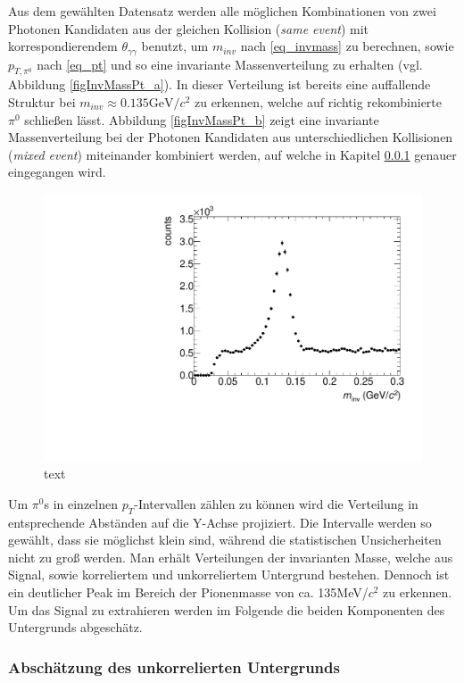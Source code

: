 \documentclass[]{article}
\begin{document}
	Aus dem gew{\"a}hlten Datensatz werden alle m{\"o}glichen Kombinationen von zwei Photonen Kandidaten aus der gleichen Kollision ({\it same event}) mit korrespondierendem $\theta_{\gamma\gamma}$ benutzt, um $m_{inv}$ nach \ref{eq_invmass} zu berechnen, sowie $p_{T,\pi^{0}}$ nach \ref{eq_pt} und so eine invariante Massenverteilung zu erhalten (vgl. Abbildung \ref{figInvMassPt_a}). In dieser Verteilung ist bereits eine auffallende Struktur bei $m_{inv}\approx 0.135\text{GeV/}c^{2}$ zu erkennen, welche auf richtig rekombinierte $\pi^{0}$ schlie{\ss}en l{\"a}sst. Abbildung \ref{figInvMassPt_b} zeigt eine invariante Massenverteilung bei der Photonen Kandidaten aus unterschiedlichen Kollisionen ({\it mixed event}) miteinander kombiniert werden, auf welche in Kapitel \ref{sssec:num3} genauer eingegangen wird.\newline
	
	\begin{figure}[tbp]
		\centering
		\includegraphics[width=.8\linewidth]{hSignalPlusBkg.pdf}
		\caption{text}
		\label{key}
	\end{figure}
	
	Um $\pi^{0}$s in einzelnen $p_{T}$-Intervallen z{\"a}hlen zu k{\"o}nnen wird die Verteilung in entsprechende Abst{\"a}nden auf die Y-Achse projiziert. Die Intervalle werden so gew{\"a}hlt, dass sie m{\"o}glichst klein sind, w{\"a}hrend die statistischen Unsicherheiten nicht zu gro{\ss} werden. Man erh{\"a}lt Verteilungen der invarianten Masse, welche aus Signal, sowie korreliertem und unkorreliertem Untergrund bestehen. Dennoch ist ein deutlicher Peak im Bereich der Pionenmasse von ca. 135MeV/$c^{2}$ zu erkennen. Um das Signal zu extrahieren werden im Folgende die beiden Komponenten des Untergrunds abgesch{\"a}tz.
	
	\subsubsection{Absch{\"a}tzung des unkorrelierten Untergrunds}
	\label{sssec:num3}
	
\end{document}
